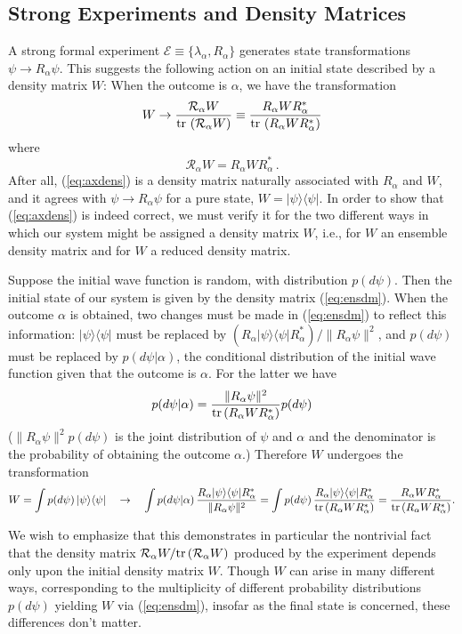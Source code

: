 \documentclass[12pt]{article}
\newcommand{\eq}[1]{(\ref{#1})}
\newcommand{\wf}{wave function}
\renewcommand{\dagger}{\ast}
\newcommand{\tr}{\mbox{${\rm tr}\,$}}
\renewcommand{\a}{\alpha}
\newcommand{\la}{\lambda_{\a}}
\newcommand{\Aa}{R_{\a}}
\newcommand{\Aad}{R^{\dagger}_{\a}}
\newcommand{\norm}{\|}
\begin{document}
\subsection{Strong Experiments and Density Matrices}\label{secSEI}

A strong formal experiment $\mathcal{E}\equiv\{\la, \Aa\}$ generates
state transformations $\psi\to\Aa\psi$. This suggests the following
action on an initial state described by a density matrix $W$: When the
outcome is $\a$, we have the transformation
\begin{equation}
W \to \frac{\mathcal{R}_\a W}{\tr\left(\mathcal{R}_\a W\right) }
    \equiv \frac{\Aa W \Aad}{\tr\left( \Aa W \Aad \right)}
\label{eq:axdens}
\end{equation}
where
\begin{equation}
\mathcal{R}_\a W = \Aa W \Aad\,.
\label{eq:axdens2}
\end{equation}
After all, (\ref{eq:axdens}) is a density matrix naturally associated
with $\Aa$ and $W$, and it agrees with $\psi\to\Aa\psi$ for a pure
state, $W=| \psi \rangle \langle\psi|$. In order to show that
(\ref{eq:axdens}) is indeed correct, we must verify it for the two
different ways in which our system might be assigned a density matrix
$W$, i.e., for $W$ an ensemble density matrix and for $W$ a reduced
density matrix.

Suppose the initial wave function is random, with distribution
$p(d\psi)$. Then the initial state of our system is given by the
density matrix \eq{eq:ensdm}. When the outcome $\a$ is obtained, two
changes must be made in \eq{eq:ensdm} to reflect this information: $|
\psi \rangle \langle\psi|$ must be replaced by $ (\Aa| \psi \rangle
\langle\psi|\Aad)/ \norm\Aa\psi\norm^2 $, and $p(d\psi)$ must be
replaced by $p(d\psi|\a)$, the conditional distribution of the initial
\wf{} given that the outcome is $\a$. For the latter we have
$$
p(d\psi|\a)= \frac{\norm\Aa\psi\norm^2}{\tr( \Aa W\Aad)} p(d\psi)
$$
($ \norm\Aa\psi\norm^2p(d\psi)$ is the joint distribution of $\psi$
and $\a$ and the denominator is the probability of obtaining the
outcome $\a$.) Therefore $W$ undergoes the transformation
$$
W= \int p(d\psi )\,| \psi \rangle \langle \psi | \quad\to\quad \int
p(d\psi|\a) \,\frac{\Aa| \psi \rangle \langle
   \psi|\Aad}{\norm\Aa\psi\norm^2} = \int p (d\psi )\, \frac{\Aa | \psi
   \rangle \langle \psi| \Aad}{\tr( \Aa W\Aad)} = \frac{\Aa W
   \Aad}{\tr( \Aa W\Aad)} .
$$

We wish to emphasize that this demonstrates in particular the
nontrivial fact that the density matrix $\mathcal{R}_\a
W/\tr(\mathcal{R}_\a W)$ produced by the experiment depends only upon
the initial density matrix $W$. Though $W$ can arise in many different
ways, corresponding to the multiplicity of different probability
distributions $p(d\psi)$ yielding $W$ via \eq{eq:ensdm}, insofar as
the final state is concerned, these differences don't matter.
\end{document}
